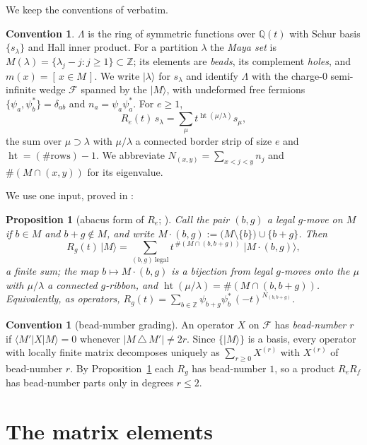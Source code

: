 \documentclass[11pt]{article}
\newtheorem{proposition}[theorem]{Proposition}
\theoremstyle{definition}
\newtheorem{convention}[theorem]{Convention}
\newcommand{\hgt}{\operatorname{ht}}          %
\newcommand{\Z}{\mathbb{Z}}
\newcommand{\Q}{\mathbb{Q}}
\newcommand{\Lam}{\Lambda}
\newcommand{\F}{\mathcal{F}}
\begin{document}
We keep the conventions of \cite{Clio0906} verbatim.

\begin{convention}\label{conv:main}
$\Lam$ is the ring of symmetric functions over $\Q(t)$ with Schur basis $\{s_\lambda\}$
and Hall inner product.  For a partition $\lambda$ the \emph{Maya set} is
$M(\lambda)=\{\lambda_j-j:j\ge1\}\subset\Z$; its elements are \emph{beads}, its complement
\emph{holes}, and $m(x)=[\,x\in M\,]$.  We write $|\lambda\rangle$ for $s_\lambda$ and
identify $\Lam$ with the charge-$0$ semi-infinite wedge $\F$ spanned by the
$|M\rangle$, with undeformed free fermions $\{\psi_a,\psi_b^*\}=\delta_{ab}$ and
$n_a=\psi_a\psi_a^*$.  For $e\ge1$,
\[
  R_e(t)\,s_\lambda=\sum_{\mu}t^{\hgt(\mu/\lambda)}s_\mu,
\]
the sum over $\mu\supset\lambda$ with $\mu/\lambda$ a connected border strip of size $e$
and $\hgt=(\#\text{rows})-1$.  We abbreviate
$N_{(x,y)}=\sum_{x<j<y}n_j$ and $\#(M\cap(x,y))$ for its eigenvalue.
\end{convention}

We use one input, proved in \cite[Lem.~2.3, Lem.~2.4, Thm.~3.3]{Clio0906}:

\begin{proposition}[abacus form of $R_e$; \cite{Clio0906}]\label{prop:abacus}
Call the pair $(b,g)$ a \emph{legal $g$-move} on $M$ if $b\in M$ and $b+g\notin M$, and
write $M\cdot(b,g):=\bigl(M\setminus\{b\}\bigr)\cup\{b+g\}$.  Then
\[
  R_g(t)\,|M\rangle=\sum_{(b,g)\ \mathrm{legal}} t^{\,\#(M\cap(b,b+g))}\;\bigl|M\cdot(b,g)\bigr\rangle,
\]
a finite sum; the map $b\mapsto M\cdot(b,g)$ is a bijection from legal $g$-moves onto the
$\mu$ with $\mu/\lambda$ a connected $g$-ribbon, and
$\hgt(\mu/\lambda)=\#(M\cap(b,b+g))$.  Equivalently, as operators,
$R_g(t)=\sum_{b\in\Z}\psi_{b+g}\psi_b^{*}\,(-t)^{N_{(b,b+g)}}$.
\end{proposition}

\begin{convention}[bead-number grading]\label{conv:grading}
An operator $X$ on $\F$ has \emph{bead-number $r$} if $\langle M'|X|M\rangle=0$ whenever
$|M\,\triangle\,M'|\ne 2r$.  Since $\{|M\rangle\}$ is a basis, every operator with
locally finite matrix decomposes uniquely as $\sum_{r\ge0}X^{(r)}$ with $X^{(r)}$ of
bead-number $r$.  By Proposition~\ref{prop:abacus} each $R_g$ has bead-number $1$, so a
product $R_eR_f$ has bead-number parts only in degrees $r\le2$.
\end{convention}

\section{The matrix elements}
\end{document}
